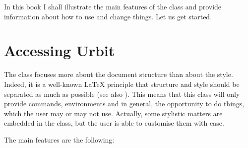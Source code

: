 
In this book I shall illustrate the main features of the class and
provide information about how to use and change things. Let us get
started.

\section{Accessing Urbit}

The  class focuses more about the document structure than
about the style. Indeed, it is a well-known \LaTeX\xspace principle that
structure and style should be separated as much as possible (see also
). This means that this class will only provide
commands, environments and in general, the opportunity to do things,
which the user may or may not use. Actually, some stylistic matters are
embedded in the class, but the user is able to customise them with ease.

The main features are the following:

